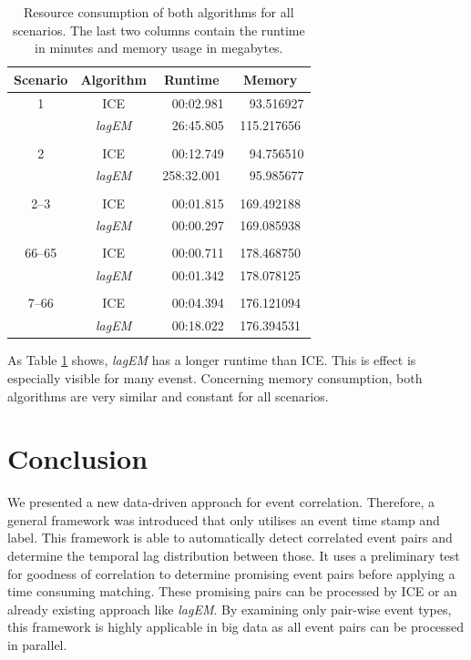 \documentclass[conference]{IEEEtran}
\theoremstyle{examplestyle}
\begin{document}
\begin{table}[!htb]
	\centering
	\begin{tabular}{c c c c}
		\textbf{Scenario} & \textbf{Algorithm} & \textbf{Runtime} & \textbf{Memory} \\
		\hline
		1	& \ac{ICE}				&	~~00:02.981	&	~~93.516927	\\
			& \textit{lagEM}		&	~~26:45.805	&	115.217656	\\
		\\
		2	& \ac{ICE}				&	~~00:12.749	&	~~94.756510	\\
			& \textit{lagEM}		&	258:32.001	&	~~95.985677	\\
		\\
		2--3 & \ac{ICE}				&	~~00:01.815	&	169.492188 \\
			&	\textit{lagEM}		&	~~00:00.297	&	169.085938 \\
		\\
		66--65 & \ac{ICE}			&	~~00:00.711	&	178.468750 \\
			&	\textit{lagEM}		&	~~00:01.342	&	178.078125 \\
		\\
		7--66 & \ac{ICE}			&	~~00:04.394	&	176.121094 \\
			&	\textit{lagEM}		&	~~00:18.022	&	176.394531 \\
	\end{tabular}
	\caption{Resource consumption of both algorithms for all scenarios. The last two columns contain the runtime in minutes and memory usage in megabytes.}
	\label{tbl:resources}
\end{table}



As Table \ref{tbl:resources} shows, \textit{lagEM} has a longer runtime than \ac{ICE}. This is effect is especially visible for many evenst. Concerning memory consumption, both algorithms are very similar and constant for all scenarios.



\section{Conclusion}
We presented a new data-driven approach for event correlation. Therefore, a general framework was introduced that only utilises an event time stamp and label. This framework is able to automatically detect correlated event pairs and determine the temporal lag distribution between those. It uses a preliminary test for goodness of correlation to determine promising event pairs before applying a time consuming matching. These promising pairs can be processed by \ac{ICE} or an already existing approach like \textit{lagEM}. By examining only pair-wise event types, this framework is highly applicable in big data as all event pairs can be processed in parallel.
\end{document}
